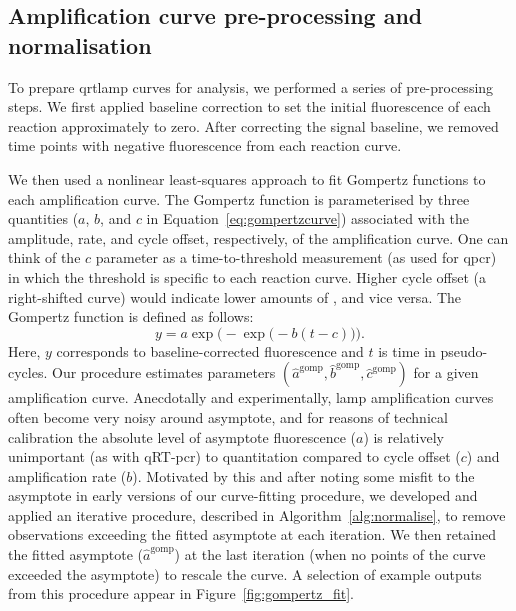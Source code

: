 \documentclass[../thesis.tex]{subfiles}
\begin{document}
\subsection{Amplification curve pre-processing and normalisation \label{sec:curvenormalisation}}
To prepare \gls{qrtlamp} curves for analysis, we performed a series of pre-processing steps. We first applied baseline correction to set the initial fluorescence of each reaction approximately to zero. 
After correcting the signal baseline, we removed time points with negative fluorescence from each reaction curve.

We then used a nonlinear least-squares approach to fit Gompertz functions to each amplification curve. The Gompertz function is parameterised by three quantities ($a$, $b$, and $c$ in Equation~\ref{eq:gompertzcurve}) associated with the amplitude, rate, and cycle offset, respectively, of the amplification curve. One can think of the $c$ parameter as a time-to-threshold measurement (as used for \gls{qpcr}) in which the threshold is specific to each reaction curve. Higher cycle offset (a right-shifted curve) would indicate lower amounts of , and vice versa. The Gompertz function is defined as follows:
\begin{equation} \label{eq:gompertzcurve}
    y = a \exp\Big(-\exp\big( -b (t - c)\big)\Big).
\end{equation}
Here, $y$ corresponds to baseline-corrected fluorescence and $t$ is time in pseudo-cycles. Our procedure estimates parameters $(\hat{a}^{\text{gomp}}, \hat{b}^{\text{gomp}}, \hat{c}^{\text{gomp}})$ for a given amplification curve. Anecdotally and experimentally, \gls{lamp} amplification curves often become very noisy around asymptote, and for reasons of technical calibration the absolute level of asymptote fluorescence ($a$) is relatively unimportant (as with qRT-\gls{pcr}) to quantitation compared to cycle offset ($c$) and amplification rate ($b$).
 Motivated by this and after noting some misfit to the asymptote in early versions of our curve-fitting procedure, we developed and applied an iterative procedure, described in Algorithm~\ref{alg:normalise}, to remove observations exceeding the fitted asymptote at each iteration. We then retained the fitted asymptote ($\hat{a}^{\text{gomp}}$) at the last iteration (when no points of the curve exceeded the asymptote) to rescale the curve. A selection of example outputs from this procedure appear in Figure~\ref{fig:gompertz_fit}.
\end{document}
